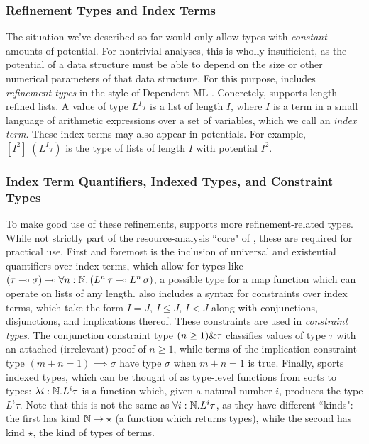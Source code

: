 \subsubsection{Refinement Types and Index Terms}
\label{sec:lambdaamor-overview-refty}
The situation we've described so far would only allow types with \textit{constant} amounts of potential. For nontrivial analyses, this is wholly insufficient, as the potential of a data structure must be able to depend on the size or other numerical parameters of that data structure. For this purpose, \lambdaamor includes \textit{refinement types} in the style of Dependent ML \cite{xi:jfp07}. Concretely, \lambdaamor supports length-refined lists. A value of type $L^I \tau$ is a list of length $I$, where $I$ is a term in a small language of arithmetic expressions over a set of variables, which we call an \textit{index term}. These index terms may also appear in potentials. For example, $\left[I^2\right] \; (L^I \tau)$ is the type of lists of length $I$ with potential $I^2$. 

\subsubsection{Index Term Quantifiers, Indexed Types, and Constraint Types}
To make good use of these refinements, \lambdaamor supports more refinement-related types. While not strictly part of the resource-analysis ``core" of \lambdaamor, these are required for practical use. First and foremost is the inclusion of universal and existential quantifiers over index terms, which allow for types like $(\tau \multimap \sigma) \multimap \forall n : \mathbb{N}. \left(L^n \,\tau \multimap L^{n} \, \sigma\right)$, a possible type for a map function which can operate on lists of any length. \lambdaamor also includes a syntax for constraints over index terms, which take the form $I = J$, $I \leq J$, $I < J$ along with conjunctions, disjunctions, and implications thereof. These constraints are used in \textit{constraint types}. The conjunction constraint type $(n \geq 1) \& \tau$ classifies values of type $\tau$ with an attached (irrelevant) proof of $n \geq 1$, while terms of the implication constraint type $(m + n = 1) \implies \sigma$ have type $\sigma$ when $m + n = 1$ is true. Finally, \lambdaamor sports indexed types, which can be thought of as type-level functions from sorts to types: $\lambda i : \mathbb{N}. L^i \tau$ is a function which, given a natural number $i$, produces the type $L^i \tau$. Note that this is not the same as $\forall i: \mathbb{N}. L^i \tau$, as they have different ``kinds": the first has kind $\mathbb{N} \to \star$ (a function which returns types), while the second has kind $\star$, the kind of types of terms.

